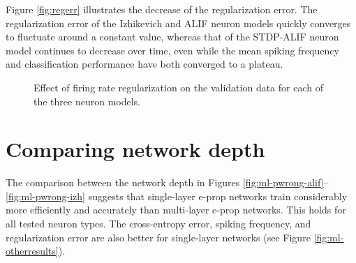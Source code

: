 		Figure \ref{fig:regerr} illustrates the decrease of the regularization error.
		The regularization error of the Izhikevich and ALIF neuron models quickly converges to fluctuate around a constant value, whereas that of the STDP-ALIF neuron model continues to decrease over time, even while the mean spiking frequency and classification performance have both converged to a plateau.

		\begin{figure}[bth]
		    \myfloatalign
		     \quad
		    \caption[Single-layer firing rate regularization per neuron model]{Effect of firing rate regularization on the validation data for each of the three neuron models.}\label{fig:sl-reg}
		\end{figure}

\section{Comparing network depth}
The comparison between the network depth in Figures \ref{fig:ml-pwrong-alif}--\ref{fig:ml-pwrong-izh} suggests that single-layer e-prop networks train considerably more efficiently and accurately than multi-layer e-prop networks.
This holds for all tested neuron types.
The cross-entropy error, spiking frequency, and regularization error are also better for single-layer networks (see Figure \ref{fig:ml-otherresults}).

